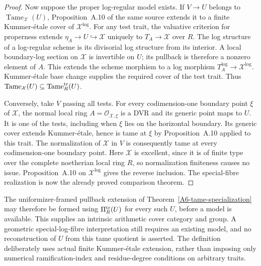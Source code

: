 \begin{proof}
Now suppose the proper log-regular model exists. If $V\to U$ belongs
to $\operatorname{Tame}_{\mathcal X}(U)$, Proposition~A.10 of the
same source extends it to a finite Kummer-\'etale cover of
$\mathcal X^{\log}$. For any test trait, the valuative criterion
for properness extends $\eta_A\to U\hookrightarrow\mathcal X$
uniquely to $T_A\to\mathcal X$ over $R$. The log structure of a
log-regular scheme is its divisorial log structure from its interior.
A local boundary-log section on $\mathcal X$ is invertible on $U$;
its pullback is therefore a nonzero element of $A$. This extends
the scheme morphism to a log morphism
$T_A^{\log}\to\mathcal X^{\log}$. Kummer-\'etale base change
supplies the required cover of the test trait. Thus
$\operatorname{Tame}_{\mathcal X}(U)
\subseteq\operatorname{Tame}^{\rm tr}_R(U)$.

Conversely, take $V$ passing all tests. For every codimension-one
boundary point $\xi$ of $\mathcal X$, the normal local ring
$A=\mathcal O_{\mathcal X,\xi}$ is a DVR and its generic point maps
to $U$. It is one of the tests, including when $\xi$ lies on the
horizontal boundary. Its generic cover extends Kummer-\'etale, hence
is tame at $\xi$ by Proposition~A.10 applied to this trait.
The normalization of $\mathcal X$ in $V$ is consequently tame at
every codimension-one boundary point. Here $\mathcal X$ is excellent,
since it is of finite type over the complete noetherian local ring
$R$, so normalization finiteness causes no issue. Proposition~A.10
on $\mathcal X^{\log}$ gives the reverse inclusion. The special-fibre
realization is now the already proved comparison theorem.
\end{proof}

The uniformizer-framed pullback extension of
Theorem~\ref{A6-tame-specialization} may therefore be formed using
$\Pi^{\rm tr}_R(U)$ for every such $U$, before a model is available.
This supplies an intrinsic arithmetic cover category and group.
A geometric special-log-fibre interpretation still requires an
existing model, and no reconstruction of $U$ from this tame quotient
is asserted. The definition deliberately uses actual finite
Kummer-\'etale extension, rather than imposing only numerical
ramification-index and residue-degree conditions on arbitrary traits.
